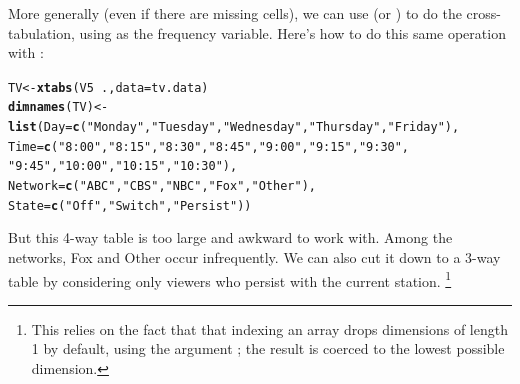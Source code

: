 \documentclass[10pt,twoside]{article}\usepackage[]{graphicx}\usepackage[]{color}
\makeatletter
\newcommand{\hlstr}[1]{\textcolor[rgb]{0.192,0.494,0.8}{#1}}%
\newcommand{\hlopt}[1]{\textcolor[rgb]{0,0,0}{#1}}%
\newcommand{\hlstd}[1]{\textcolor[rgb]{0.345,0.345,0.345}{#1}}%
\newcommand{\hlkwb}[1]{\textcolor[rgb]{0.69,0.353,0.396}{#1}}%
\newcommand{\hlkwc}[1]{\textcolor[rgb]{0.333,0.667,0.333}{#1}}%
\newcommand{\hlkwd}[1]{\textcolor[rgb]{0.737,0.353,0.396}{\textbf{#1}}}%
\newenvironment{kframe}{%
 \def\at@end@of@kframe{}%
 \ifinner\ifhmode%
  \def\at@end@of@kframe{\end{minipage}}%
  \begin{minipage}{\columnwidth}%
 \fi\fi%
 \def\FrameCommand##1{\hskip\@totalleftmargin \hskip-\fboxsep
 \colorbox{shadecolor}{##1}\hskip-\fboxsep
     \hskip-\linewidth \hskip-\@totalleftmargin \hskip\columnwidth}%
 \MakeFramed {\advance\hsize-\width
   \@totalleftmargin\z@ \linewidth\hsize
   \@setminipage}}%
 {\par\unskip\endMakeFramed%
 \at@end@of@kframe}
\newenvironment{knitrout}{}{} %
\newcommand{\codefun}[1]{\code{#1()}}
\makeatother
\begin{document}
More generally (even if there are missing cells), we can 
use \codefun{xtabs} (or \codefun{plyr::daply})
to do the cross-tabulation, using  as the
frequency variable.  Here's how to do this same operation with \codefun{xtabs}:
\begin{knitrout}
\color{fgcolor}\begin{kframe}
\begin{alltt}
\hlstd{TV} \hlkwb{<-} \hlkwd{xtabs}\hlstd{(V5} \hlopt{~} \hlstd{.,} \hlkwc{data}\hlstd{=tv.data)}
\hlkwd{dimnames}\hlstd{(TV)} \hlkwb{<-} \hlkwd{list}\hlstd{(}\hlkwc{Day}\hlstd{=}\hlkwd{c}\hlstd{(}\hlstr{"Monday"}\hlstd{,}\hlstr{"Tuesday"}\hlstd{,}\hlstr{"Wednesday"}\hlstd{,}\hlstr{"Thursday"}\hlstd{,}\hlstr{"Friday"}\hlstd{),}
                \hlkwc{Time}\hlstd{=}\hlkwd{c}\hlstd{(}\hlstr{"8:00"}\hlstd{,}\hlstr{"8:15"}\hlstd{,}\hlstr{"8:30"}\hlstd{,}\hlstr{"8:45"}\hlstd{,}\hlstr{"9:00"}\hlstd{,}\hlstr{"9:15"}\hlstd{,}\hlstr{"9:30"}\hlstd{,}
                       \hlstr{"9:45"}\hlstd{,}\hlstr{"10:00"}\hlstd{,}\hlstr{"10:15"}\hlstd{,}\hlstr{"10:30"}\hlstd{),}
                \hlkwc{Network}\hlstd{=}\hlkwd{c}\hlstd{(}\hlstr{"ABC"}\hlstd{,}\hlstr{"CBS"}\hlstd{,}\hlstr{"NBC"}\hlstd{,}\hlstr{"Fox"}\hlstd{,}\hlstr{"Other"}\hlstd{),}
                \hlkwc{State}\hlstd{=}\hlkwd{c}\hlstd{(}\hlstr{"Off"}\hlstd{,}\hlstr{"Switch"}\hlstd{,}\hlstr{"Persist"}\hlstd{))}
\end{alltt}
\end{kframe}
\end{knitrout}


But this 4-way table is too large and awkward to work with. Among the networks,
Fox and Other occur infrequently. 
We can also cut it down to a 3-way table by considering only viewers who persist
with the current station.%
\footnote{This relies on the fact that that indexing
an array drops dimensions of length 1 by default,
using the argument ;
the result is coerced to the lowest possible dimension.
}
\end{document}
